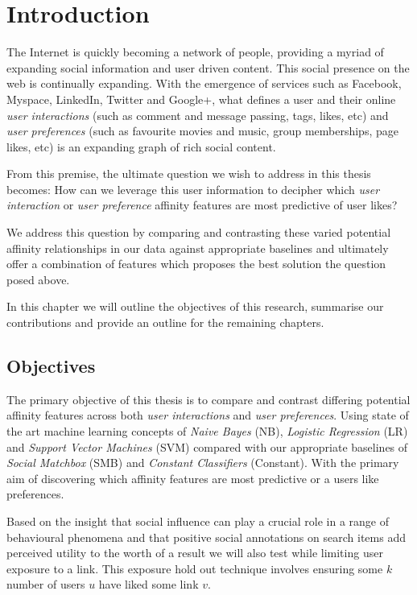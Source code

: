 
\chapter{Introduction}
\label{cha:intro}

The Internet is quickly becoming a network of people, providing a myriad of expanding social information and user driven content. 
This social presence on the web is continually expanding. With the emergence of services such as Facebook, Myspace, LinkedIn, Twitter 
and Google+, what defines a user and their online \emph{user interactions} (such as comment and message passing, tags, likes, etc) and \emph{user preferences} 
(such as favourite movies and music, group memberships, page likes, etc) is an expanding graph of rich social content. 

From this premise, the ultimate question we wish to address in this thesis becomes: 
How can we leverage this user information to decipher which \emph{user interaction} or \emph{user preference} affinity features 
are most predictive of user likes? 

We address this question by comparing and contrasting these varied potential affinity relationships in our data against appropriate 
baselines and ultimately offer a combination of features which proposes the best solution the question posed above.

In this chapter we will outline the objectives of this research, summarise our contributions and provide an outline for the remaining
chapters.

\section{Objectives}
\label{sec:objectives}

The primary objective of this thesis is to compare and contrast differing potential affinity features across both \emph{user interactions} and 
\emph{user preferences}. Using state of the art machine learning concepts of \emph{Naive Bayes} (NB), \emph{Logistic Regression} (LR) 
and \emph{Support Vector Machines} (SVM) compared with our appropriate baselines of \emph{Social Matchbox} (SMB) and \emph{Constant Classifiers} (Constant). 
With the primary aim of discovering which affinity features are most predictive or a users like preferences.

Based on the insight that social inﬂuence can play a crucial role in a range of behavioural phenomena \cite{grano,watts} and that
positive social annotations on search items add perceived utility to the worth of a result \cite{pantel} we will 
also test while limiting user exposure to a link. This exposure hold out technique involves ensuring some $k$ number of users $u$ have 
liked some link $v$.


